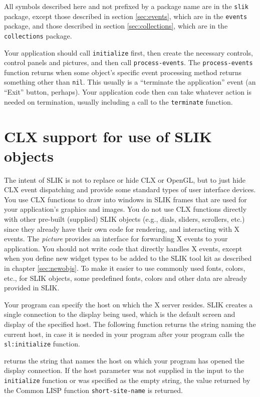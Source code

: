 \documentclass[twoside,openright,11pt]{report}
\newcommand{\tp}[1]{\texttt{#1}}
\begin{document}
All symbols described here and not prefixed by a package name are in
the \tp{slik} package, except those described in section
\ref{sec:events}, which are in the \tp{events} package, and those
described in section \ref{sec:collections}, which are in the
\tp{collections} package.

Your application should call \tp{initialize} first, then create the
necessary controls, control panels and pictures, and then call
\tp{process-events}.  The \tp{process-events} function returns when
some object's specific event processing method returns something other
than \tp{nil}.  This usually is a ``terminate the application'' event
(an ``Exit'' button, perhaps).  Your application code then can take
whatever action is needed on termination, usually including a call to
the \tp{terminate} function.

\section{CLX support for use of SLIK objects} \label{sec:clx-support}

The intent of SLIK is not to replace or hide CLX or OpenGL, but to
just hide CLX event dispatching and provide some standard types of
user interface devices.  You use CLX functions to draw into windows in
SLIK frames that are used for your application's graphics and images.
You do not use CLX functions directly with other pre-built (supplied)
SLIK objects (e.g., dials, sliders, scrollers, etc.) since they
already have their own code for rendering, and interacting with X
events.  The \emph{picture} provides an interface for forwarding X
events to your application.  You should not write code that directly
handles X events, except when you define new widget types to be added
to the SLIK tool kit as described in chapter \ref{sec:newobjs}.  To
make it easier to use commonly used fonts, colors, etc., for SLIK
objects, some predefined fonts, colors and other data are already
provided in SLIK.

Your program can specify the host on which the X server resides.  SLIK
creates a single connection to the display being used, which is the
default screen and display of the specified host.  The following
function returns the string naming the current host, in case it is
needed in your program after your program calls the \tp{sl:initialize}
function.

{returns the string that names the host on which your program has
opened the display connection.  If the host parameter was not supplied
in the input to the \tp{initialize} function or was specified as the
empty string, the value returned by the Common LISP function
\tp{short-site-name} is returned.}
\end{document}
